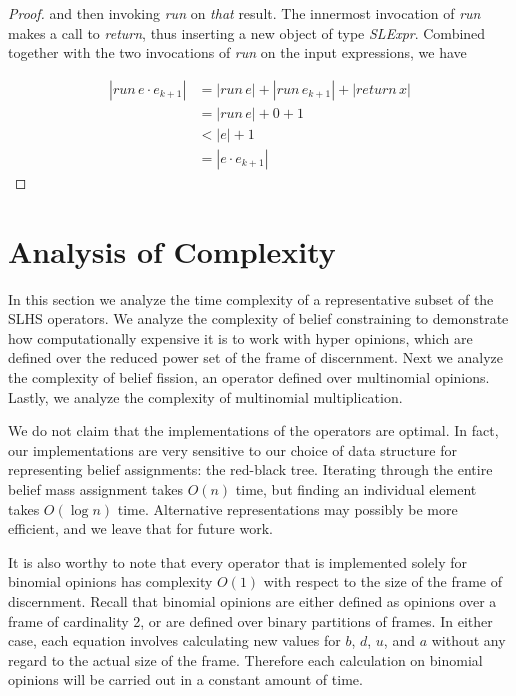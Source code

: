 \documentclass[thesis.tex]{subfiles}
\begin{document}
\begin{proof}
  and then invoking \emph{run} on \emph{that} result. The innermost invocation of \emph{run} makes a call
  to \emph{return}, thus inserting a new object of type \emph{SLExpr}. Combined together with the two
  invocations of \emph{run} on the input expressions, we have

  \begin{equation*}
  \begin{split}
    |run\,e \cdot e_{k + 1}|& = |run\,e| + |run\,e_{k+1}| + |return\,x| \\
                     & = |run\,e| + 0 + 1 \\
                     & < |e| + 1 \\
                     & = |e \cdot e_{k+1}|
  \end{split}
  \end{equation*}

\end{proof}



%
%


\section{Analysis of Complexity}
\label{sec:complexity}

In this section we analyze the time complexity of a representative subset of the SLHS operators. We
analyze the complexity of belief constraining to demonstrate how computationally expensive it is to
work with hyper opinions, which are defined over the reduced power set of the frame of discernment.
Next we analyze the complexity of belief fission, an operator defined over multinomial opinions.
Lastly, we analyze the complexity of multinomial multiplication.

We do not claim that the implementations of the operators are optimal. In fact, our implementations
are very sensitive to our choice of data structure for representing belief assignments: the red-black
tree. Iterating through the entire belief mass assignment takes $O (n)$ time, but finding an individual
element takes $O (\log n)$ time. Alternative representations may possibly be more efficient, and we leave
that for future work.

It is also worthy to note that every operator that is implemented solely for binomial opinions has
complexity $O(1)$ with respect to the size of the frame of discernment. Recall that binomial opinions
are either defined as opinions over a frame of cardinality 2, or are defined over binary partitions of
frames. In either case, each equation involves calculating new values for $b$, $d$, $u$, and $a$ without
any regard to the actual size of the frame. Therefore each calculation on binomial opinions will be
carried out in a constant amount of time.
\end{document}
